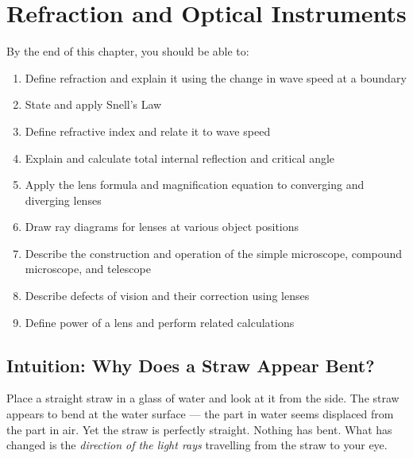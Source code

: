 %

\chapter{Refraction and Optical Instruments}
\label{ch:refraction_optics}
\minitoc
\newpage


\begin{objectivebox}
By the end of this chapter, you should be able to:
\begin{enumerate}[noitemsep]
  \item Define refraction and explain it using the
  change in wave speed at a boundary
  \item State and apply Snell's Law
  \item Define refractive index and relate it to
  wave speed
  \item Explain and calculate total internal
  reflection and critical angle
  \item Apply the lens formula and magnification
  equation to converging and diverging lenses
  \item Draw ray diagrams for lenses at various
  object positions
  \item Describe the construction and operation of
  the simple microscope, compound microscope,
  and telescope
  \item Describe defects of vision and their
  correction using lenses
  \item Define power of a lens and perform related
  calculations
\end{enumerate}
\end{objectivebox}

\section{Intuition: Why Does a Straw Appear Bent?}

Place a straight straw in a glass of water and look
at it from the side. The straw appears to bend at the
water surface --- the part in water seems displaced
from the part in air. Yet the straw is perfectly
straight. Nothing has bent. What has changed is the
\textit{direction of the light rays} travelling from
the straw to your eye.

